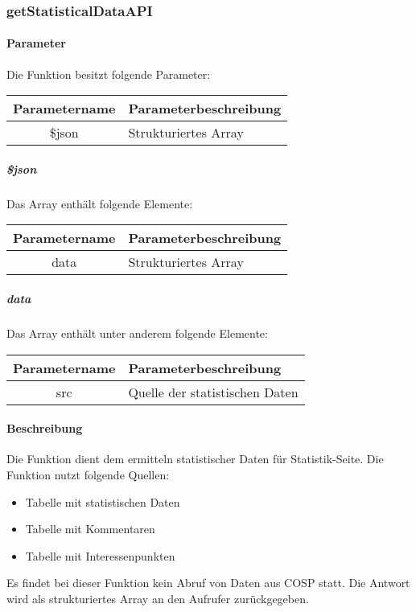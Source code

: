 \subsubsection{getStatisticalDataAPI}
\paragraph{Parameter} Die Funktion besitzt folgende Parameter:
\begin{table}[H]
	\begin{tabular}{|c|p{11cm}|}
		\hline
		\textbf{Parametername} & \textbf{Parameterbeschreibung} \\ \hline
		\$json & Strukturiertes Array \\ \hline
	\end{tabular}
\end{table}
\subparagraph{\$json}Das Array enthält folgende Elemente:
\begin{table}[H]
	\begin{tabular}{|c|p{11cm}|}
		\hline
		\textbf{Parametername} & \textbf{Parameterbeschreibung} \\ \hline
		data & Strukturiertes Array \\ \hline
	\end{tabular}
\end{table}
\subparagraph{data}Das Array enthält unter anderem folgende Elemente:
\begin{table}[H]
	\begin{tabular}{|c|p{11cm}|}
		\hline
		\textbf{Parametername} & \textbf{Parameterbeschreibung} \\ \hline
		src & Quelle der statistischen Daten \\ \hline
	\end{tabular}
\end{table}
\paragraph{Beschreibung} Die Funktion dient dem ermitteln statistischer Daten für Statistik-Seite. Die Funktion nutzt folgende Quellen:
\begin{itemize}
	\item Tabelle mit statistischen Daten
	\item Tabelle mit Kommentaren
	\item Tabelle mit Interessenpunkten
\end{itemize}
Es findet bei dieser Funktion kein Abruf von Daten aus {\glqq COSP\grqq} statt. Die Antwort wird als strukturiertes Array an den Aufrufer zurückgegeben.
